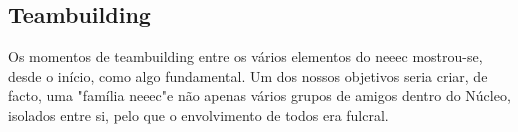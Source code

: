 
\subsection{Teambuilding}

Os momentos de teambuilding entre os vários elementos do \acrshort{neeec} mostrou-se, desde o início, como algo fundamental. Um dos nossos objetivos seria criar, de facto, uma "família \acrshort{neeec}"\space e não apenas vários grupos de amigos dentro do Núcleo, isolados entre si, pelo que o envolvimento de todos era fulcral.

















